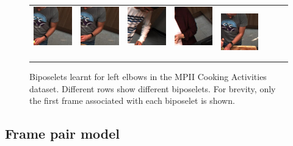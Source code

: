 \documentclass[runningheads]{llncs}
\begin{document}
\begin{figure}[t]
\begin{center}
\begin{tabular}{@{}c@{}c@{}c@{}c@{}c@{}c@{}c@{}c@{}}
\includegraphics[height=0.1375\linewidth]{figures/biposelets/poselet-297/sample-3-f0.jpg}\,&
\includegraphics[height=0.1375\linewidth]{figures/biposelets/poselet-297/sample-4-f0.jpg}\,&
\includegraphics[height=0.1375\linewidth]{figures/biposelets/poselet-297/sample-5-f0.jpg}\,&
\includegraphics[height=0.1375\linewidth]{figures/biposelets/poselet-297/sample-6-f0.jpg}\,&
\includegraphics[height=0.1375\linewidth]{figures/biposelets/poselet-297/sample-7-f0.jpg}\\
\end{tabular}
\end{center}
\vspace{-5mm}
\caption{Biposelets learnt for left elbows in the MPII Cooking Activities
dataset. Different rows show different biposelets. For brevity,
only the first frame associated with each biposelet is shown.}
\label{fig:biposelets}
\end{figure}


\subsection{Frame pair model}
\end{document}
